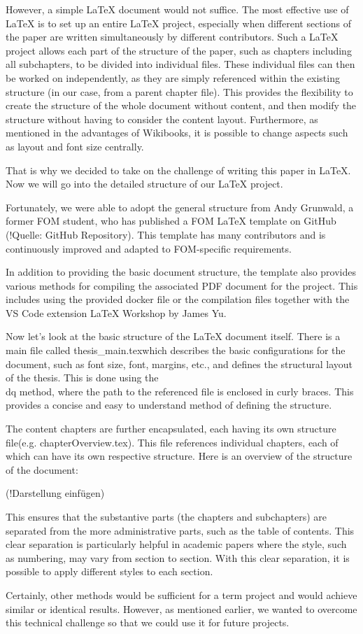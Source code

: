 However, a simple \LaTeX{} document would not suffice. The most effective use of \LaTeX{} is to set up an entire \LaTeX{} project, especially when different sections of the paper are written simultaneously by different contributors. Such a \LaTeX{} project allows each part of the structure of the paper, such as chapters including all subchapters, to be divided into individual files. These individual files can then be worked on independently, as they are simply referenced within the existing structure (in our case, from a parent chapter file). This provides the flexibility to create the structure of the whole document without content, and then modify the structure without having to consider the content layout. Furthermore, as mentioned in the advantages of Wikibooks, it is possible to change aspects such as layout and font size centrally.

That is why we decided to take on the challenge of writing this paper in \LaTeX{}. Now we will go into the detailed structure of our \LaTeX{} project.

Fortunately, we were able to adopt the general structure from Andy Grunwald, a former FOM student, who has published a \dq FOM \LaTeX{} template \dq  on GitHub (!Quelle: GitHub Repository). This template has many contributors and is continuously improved and adapted to FOM-specific requirements.

In addition to providing the basic document structure, the template also provides various methods for compiling the associated PDF document for the project. This includes using the provided docker file or the compilation files together with the VS Code extension \dq \LaTeX{} Workshop \dq  by James Yu.

Now let's look at the basic structure of the \LaTeX{} document itself. There is a main file called \dq thesis\_main.tex\dq  which describes the basic configurations for the document, such as font size, font, margins, etc., and defines the structural layout of the thesis. This is done using the \dq \\dq  method, where the path to the referenced file is enclosed in curly braces. This provides a concise and easy to understand method of defining the structure.

The content chapters are further encapsulated, each having its own \dq structure file\dq  (e.g. chapterOverview.tex). This file references individual chapters, each of which can have its own respective structure. Here is an overview of the structure of the document:

(!Darstellung einfügen)

This ensures that the substantive parts (the chapters and subchapters) are separated from the more administrative parts, such as the table of contents. This clear separation is particularly helpful in academic papers where the style, such as numbering, may vary from section to section. With this clear separation, it is possible to apply different styles to each section.

Certainly, other methods would be sufficient for a term project and would achieve similar or identical results. However, as mentioned earlier, we wanted to overcome this technical challenge so that we could use it for future projects.